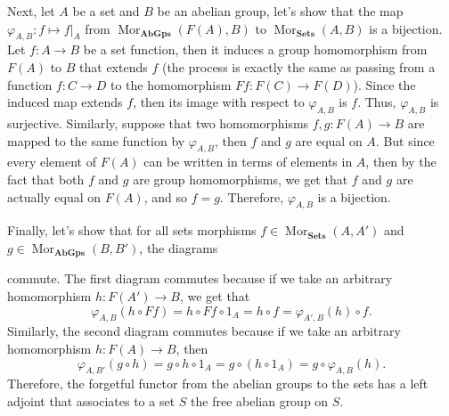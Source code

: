 \documentclass{article}
\newcommand{\CatSets}{\textbf{Sets}}
\newcommand{\CatAbGps}{\textbf{AbGps}}
\DeclareMathOperator{\Mor}{Mor}
\begin{document}
\begin{enumerate}[label=(\alph*)]
    Next, let $A$ be a set and $B$ be an abelian group, let's show that the map $\varphi_{A,B} : f \mapsto f|_{A}$ from $\Mor_{\CatAbGps}(F(A), B)$ to $\Mor_{\CatSets}(A,B)$ is a bijection. Let $f : A \to B$ be a set function, then it induces a group homomorphism from $F(A)$ to $B$ that extends $f$ (the process is exactly the same as passing from a function $f : C \to D$ to the homomorphism $Ff : F(C) \to F(D)$). Since the induced map extends $f$, then its image with respect to $\varphi_{A,B}$ is $f$. Thus, $\varphi_{A,B}$ is surjective. Similarly, suppose that two homomorphisms $f,g : F(A) \to B$ are mapped to the same function by $\varphi_{A,B}$, then $f$ and $g$ are equal on $A$. But since every element of $F(A)$ can be written in terms of elements in $A$, then by the fact that both $f$ and $g$ are group homomorphisms, we get that $f$ and $g$ are actually equal on $F(A)$, and so $f = g$. Therefore, $\varphi_{A,B}$ is a bijection.

    Finally, let's show that for all sets morphisms $f \in \Mor_{\CatSets}(A,A')$ and $g \in \Mor_{\CatAbGps}(B,B')$, the diagrams
    \begin{center}
    \end{center}
    commute. The first diagram commutes because if we take an arbitrary homomorphism $h : F(A') \to B$, we get that
    $$\varphi_{A,B}(h \circ Ff) = h \circ Ff \circ 1_A = h \circ f = \varphi_{A',B}(h)\circ f.$$
    Similarly, the second diagram commutes because if we take an arbitrary homomorphism $h : F(A) \to B$, then
    $$\varphi_{A,B'}(g \circ h) = g \circ h \circ 1_A = g \circ (h \circ 1_A) = g \circ \varphi_{A,B}(h).$$
    Therefore, the forgetful functor from the abelian groups to the sets has a left adjoint that associates to a set $S$ the free abelian group on $S$.
\end{enumerate}
\end{document}
